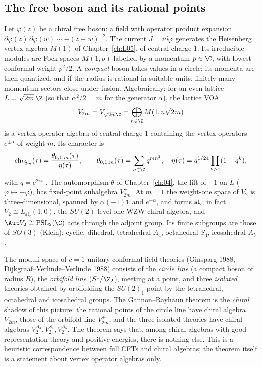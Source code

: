 \subsection{The free boson and its rational points}

Let $\varphi(z)$ be a chiral free boson: a field with operator product expansion
$\partial\varphi(z)\,\partial\varphi(w)\sim -(z-w)^{-2}$. The current $J=i\partial\varphi$ generates the
Heisenberg vertex algebra $M(1)$ of Chapter~\ref{ch:L05}, of central charge $1$. Its irreducible modules
are Fock spaces $M(1,p)$ labelled by a momentum $p\in\C$, with lowest conformal weight $p^2/2$. A
\emph{compact} boson takes values in a circle; its momenta are then quantized, and if the radius is
rational in suitable units, finitely many momentum sectors close under fusion. Algebraically: for an even
lattice $L=\sqrt{2m}\,\Z$ (so that $\alpha^2/2 = m$ for the generator $\alpha$), the lattice VOA
\begin{equation*}
V_{2m} = V_{\sqrt{2m}\Z} = \bigoplus_{n\in\Z} M(1, n\sqrt{2m})
\end{equation*}
is a vertex operator algebra of central charge $1$ containing the vertex operators $e^{\pm\alpha}$ of
weight $m$. Its character is
\begin{equation}\label{l22:eq:latchar}
\ltwotwoch_{V_{2m}}(\tau) = \frac{\theta_{0,1,m}(\tau)}{\eta(\tau)}, \qquad
\theta_{0,1,m}(\tau)=\sum_{n\in\Z} q^{m n^2},\quad \eta(\tau) = q^{1/24}\prod_{k\ge1}(1-q^k),
\end{equation}
with $q=e^{2\pi i\tau}$. The automorphism $\theta$ of Chapter~\ref{ch:04}, the lift of $-1$ on $L$
($\varphi\mapsto-\varphi$), has fixed-point subalgebra $V_{2m}^+$. At $m=1$ the weight-one space of $V_2$ is
three-dimensional, spanned by $\alpha(-1)\mathbf 1$ and $e^{\pm\alpha}$, and forms $\mathfrak{sl}_2$; in fact
$V_2\cong L_{\mathfrak{sl}_2}(1,0)$, the $SU(2)$ level-one WZW chiral algebra, and $\Aut V_2 \cong
\mathrm{PSL}_2(\C)$ acts through the adjoint group. Its finite subgroups are those of $SO(3)$ (Klein):
cyclic, dihedral, tetrahedral $A_4$, octahedral $S_4$, icosahedral $A_5$.

\begin{physics}
The moduli space of $c=1$ unitary conformal field theories (Ginsparg 1988, Dijkgraaf--Verlinde--Verlinde
1988) consists of the \emph{circle line} (a compact boson of radius $R$), the \emph{orbifold line}
($S^1/\Z_2$), meeting at a point, and three \emph{isolated} theories obtained by orbifolding the $SU(2)_1$
point by the tetrahedral, octahedral and icosahedral groups. The Gannon--Rayhaun theorem is the
\emph{chiral} shadow of this picture: the rational points of the circle line have chiral algebra $V_{2m}$,
those of the orbifold line $V_{2m}^+$, and the three isolated theories have chiral algebras
$V_2^{A_4},V_2^{S_4},V_2^{A_5}$. The theorem says that, among chiral algebras with good representation theory
and positive energies, there is nothing else. This is a heuristic correspondence between full CFTs and
chiral algebras; the theorem itself is a statement about vertex operator algebras only.
\end{physics}

